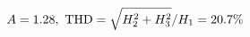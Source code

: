\documentclass[preview]{standalone}
\begin{document}
\begin{align*}
\special{dvisvgm:raw <g id='unique000'>}A=1.28,\ \text{THD}=\sqrt{H_2^2+H_3^2}/H_1=20.7\%\special{dvisvgm:raw </g>}
\end{align*}
\end{document}
